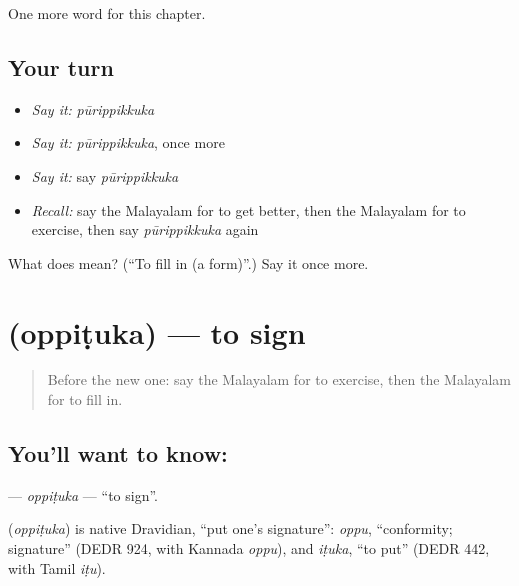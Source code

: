 \begin{grammarlens}[title={What you've built}]
One more word for this chapter.
\end{grammarlens}

\subsection*{Your turn}
\begin{itemize}
\raggedright
  \item \emph{Say it:} \emph{pūrippikkuka}
  \item \emph{Say it:} \emph{pūrippikkuka}, once more
  \item \emph{Say it:} say \emph{pūrippikkuka}
  \item \emph{Recall:} say the Malayalam for to get better, then the Malayalam for to exercise, then say \emph{pūrippikkuka} again
\end{itemize}

\begin{tcolorbox}[breakable,colback=teal!4,colframe=teal!35!black,title={Before you move on}]
What does  mean? (\textquotedblleft{}To fill in (a form)\textquotedblright{}.) Say it once more.
\end{tcolorbox}
\section[\texorpdfstring{\ml{ഒപ്പിടുക} (oppiṭuka)}{ഒപ്പിടുക (oppiṭuka)}]{ (oppiṭuka) — to sign}

\label{lesson:ML-C184-oppituka}



\begin{quote}
Before the new one: say the Malayalam for to exercise, then the Malayalam for to fill in.
\end{quote}

\subsection*{You'll want to know: }
\textbf{} — \emph{oppiṭuka} — \textquotedblleft{}to sign\textquotedblright{}.

\begin{cousinweb}
\textbf{} (\emph{oppiṭuka}) is native Dravidian, \textquotedblleft{}put one's signature\textquotedblright{}: \emph{oppu}, \textquotedblleft{}conformity; signature\textquotedblright{} (DEDR 924, with Kannada \emph{oppu}), and \emph{iṭuka}, \textquotedblleft{}to put\textquotedblright{} (DEDR 442, with Tamil \emph{iṭu}).
\end{cousinweb}

